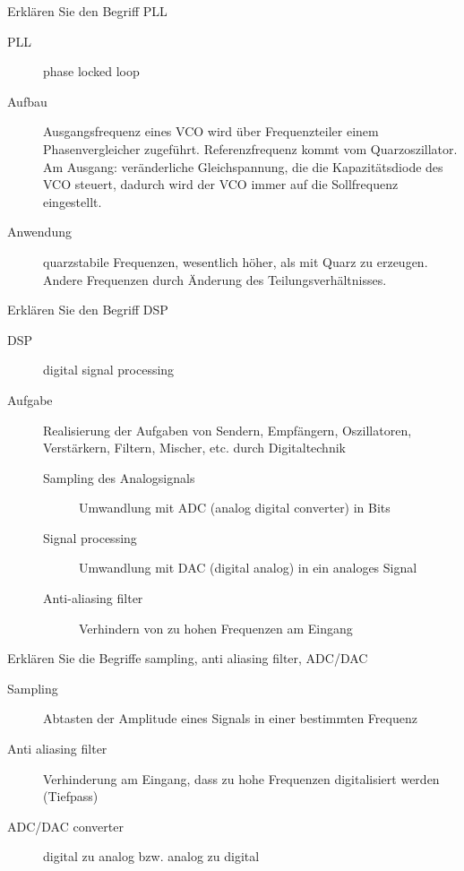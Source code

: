 \documentclass[avery5371,grid,frame,a4paper]{flashcards}
\newcommand{\card}[3]{
  \begin{flashcard}[{\chap} -- #1]{#2}#3\end{flashcard}
}
\begin{document}
\card{54}{Erklären Sie den Begriff PLL}{
  \small
  \begin{description}
    \item[PLL] phase locked loop
    \item[Aufbau]
      Ausgangsfrequenz eines VCO wird über Frequenzteiler einem Phasenvergleicher zugeführt.
      Referenzfrequenz kommt vom Quarzoszillator.
      Am Ausgang: veränderliche Gleichspannung, die die Kapazitätsdiode des VCO steuert,
      dadurch wird der VCO immer auf die Sollfrequenz eingestellt.
    \item[Anwendung]
      quarzstabile Frequenzen, wesentlich höher, als mit Quarz zu erzeugen.
      Andere Frequenzen durch Änderung des Teilungsverhältnisses.
  \end{description}
}
\card{55}{Erklären Sie den Begriff DSP}{
  \small
  \begin{description}
    \item[DSP] digital signal processing
    \item[Aufgabe]
      Realisierung der Aufgaben von Sendern, Empfängern, Oszillatoren, Verstärkern, Filtern, Mischer, etc.
      durch Digitaltechnik
      \begin{description}
        \item[Sampling des Analogsignals] Umwandlung mit ADC (analog digital converter) in Bits
        \item[Signal processing] Umwandlung mit DAC (digital analog) in ein analoges Signal
        \item[Anti-aliasing filter] Verhindern von zu hohen Frequenzen am Eingang
      \end{description}
  \end{description}
}
\card{56}{Erklären Sie die Begriffe sampling, anti aliasing filter, ADC/DAC}{
  \begin{description}
    \item[Sampling] Abtasten der Amplitude eines Signals in einer bestimmten Frequenz
    \item[Anti aliasing filter] Verhinderung am Eingang, dass zu hohe Frequenzen digitalisiert werden (Tiefpass)
    \item[ADC/DAC converter] digital zu analog bzw. analog zu digital
  \end{description}
}
\end{document}
